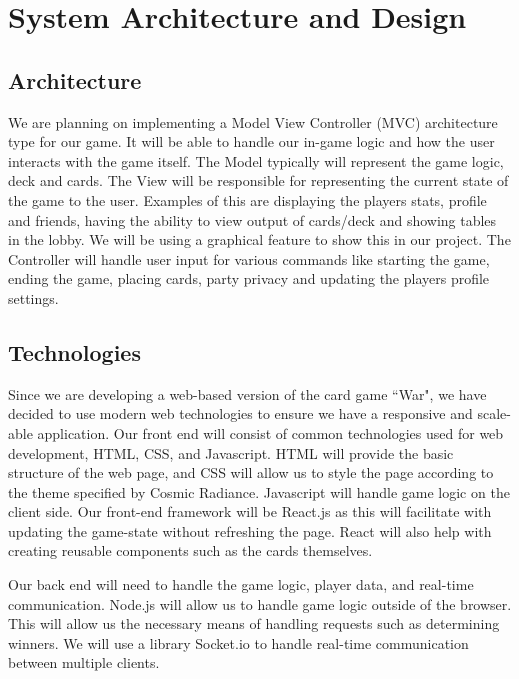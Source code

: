 \section{System Architecture and Design}



\subsection{Architecture}
We are planning on implementing a Model View Controller (MVC) architecture type for our game. It will be able to handle our in-game logic and how the user interacts with the game itself.
The Model typically will represent the game logic, deck and cards. The View will be responsible for representing the current state of the game to the user. Examples of this are displaying the players stats, profile and friends, having the ability to view output of cards/deck and showing tables in the lobby. We will be using a graphical feature to show this in our project. The Controller will handle user input for various commands like starting the game, ending the game, placing cards, party privacy and updating the players profile settings.

\subsection{Technologies}
Since we are developing a web-based version of the card game ``War", we have decided to use modern web technologies to ensure we have a responsive and scale-able application. Our front end will consist of common technologies used for web development, HTML, CSS, and Javascript. HTML will provide the basic structure of the web page, and CSS will allow us to style the page according to the theme specified by Cosmic Radiance. Javascript will handle game logic on the client side. Our front-end framework will be React.js as this will facilitate with updating the game-state without refreshing the page. React will also help with creating reusable components such as the cards themselves. 

Our back end will need to handle the game logic, player data, and real-time communication. Node.js will allow us to handle game logic outside of the browser. This will allow us the necessary means of handling requests such as determining winners. We will use a library Socket.io to handle real-time communication between multiple clients. 

